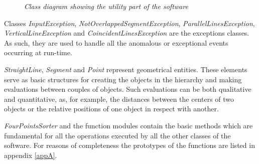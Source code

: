 		\begin{figure}[h]
		  \begin{center} 
		  \end{center} 
		  \caption{\textit{Class diagram showing the utility part of the software}}  
		  \label{fig:impl_utility}
	 	\end{figure}

		Classes \emph{InputException}, \emph{NotOverlappedSegmentException}, \emph{ParallelLinesException}, \emph{VerticalLineException} and \emph{CoincidentLinesException} are the exceptions classes. 
		As such, they are used to handle all the anomalous or exceptional events occurring at run-time.	
	
		\emph{StraightLine}, \emph{Segment} and \emph{Point} represent geometrical entities. These elements serve as basic structures for creating the objects in the hierarchy and making evaluations between couples of objects.
		Such evaluations can be both qualitative and quantitative, as, for example, the distances between the centers of two objects or the relative positions of one object in respect with another.
		
		\emph{FourPointsSorter} and the function modules contain the basic methods which are fundamental for all the operations executed by all the other classes of the software.
		For reasons of completeness the prototypes of the functions are listed in appendix \ref{appA}.

		


